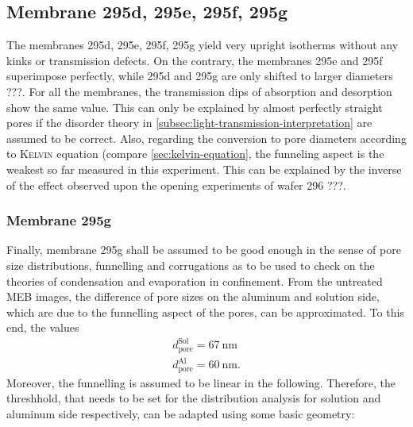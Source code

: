 \documentclass[thesis.tex]{subfiles}
\begin{document}
                


        \subsection{Membrane 295d, 295e, 295f, 295g}

            The membranes 295d, 295e, 295f, 295g yield very upright isotherms without any kinks or transmission defects. On the contrary, the membranes 295e and 295f superimpose perfectly, while 295d and 295g are only shifted to larger diameters ???. For all the membranes, the transmission dips of absorption and desorption show the same value. This can only be explained by almost perfectly straight pores if the disorder theory in \cref{subsec:light-transmission-interpretation} are assumed to be correct. Also, regarding the conversion to pore diameters according to \textsc{Kelvin} equation (compare \cref{sec:kelvin-equation}, the funneling aspect is the weakest so far measured in this experiment. This can be explained by the inverse of the effect observed upon the opening experiments of wafer 296 ???.

            \subsubsection{Membrane 295g}

              Finally, membrane 295g shall be assumed to be good enough in the sense of pore size distributions, funnelling and corrugations as to be used to check on the theories of condensation and evaporation in confinement. From the untreated MEB images, the difference of pore sizes on the aluminum and solution side, which are due to the funnelling aspect of the pores, can be approximated. To this end, the values
              \begin{equation}
                \begin{split}
                  d_\mathrm{pore}^\mathrm{Sol}=\SI{67}{\nano\meter}  \\
                  d_\mathrm{pore}^\mathrm{Al}=\SI{60}{\nano\meter}.
                \end{split}
                \label{eq:295g_pore_sizes}
              \end{equation}
              Moreover, the funnelling is assumed to be linear in the following. Therefore, the threshhold, that needs to be set for the distribution analysis for solution and aluminum side respectively, can be adapted using some basic geometry:
              \medskip
\end{document}
